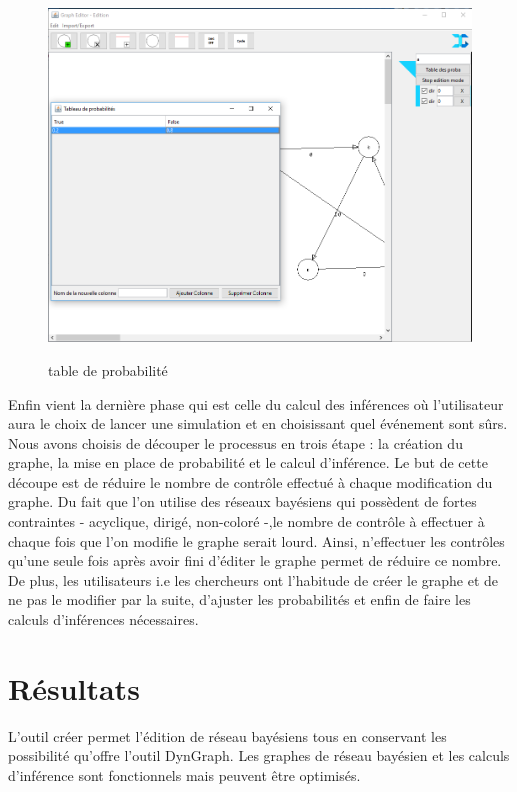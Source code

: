 \documentclass[conference]{IEEEtran}
\begin{document}
\begin{figure}[!h]
\includegraphics[scale=0.3]{Proba.png}
\label{fig 3}
\caption{table de probabilité}
\end{figure}

Enfin vient la dernière phase qui est celle du calcul des inférences où l'utilisateur aura le choix de lancer une simulation et en choisissant quel événement sont sûrs.\\

Nous avons choisis de découper le processus en trois étape : la création du graphe, la mise en place de probabilité et le calcul d'inférence. Le but de cette découpe est de réduire le nombre de contrôle effectué à chaque modification du graphe. Du fait que l'on utilise des réseaux bayésiens qui possèdent de fortes contraintes - acyclique, dirigé, non-coloré -,le nombre de contrôle à effectuer à chaque fois que l'on modifie le graphe serait lourd. Ainsi, n'effectuer les contrôles qu'une seule fois après avoir fini d'éditer le graphe permet de réduire ce nombre. De plus, les utilisateurs i.e les chercheurs ont l'habitude de créer le graphe et de ne pas le modifier par la suite, d'ajuster les probabilités et enfin de faire les calculs d'inférences nécessaires.

\section{Résultats}
	L'outil créer permet l'édition de réseau bayésiens tous en conservant les possibilité qu'offre l'outil DynGraph. Les graphes de réseau bayésien et les calculs d'inférence sont fonctionnels mais peuvent être optimisés.
	
\end{document}
